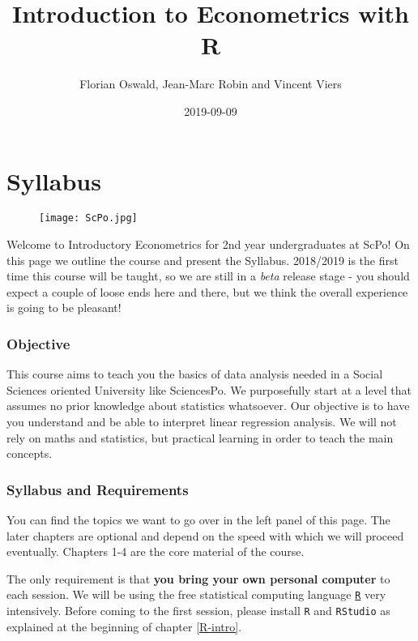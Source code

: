 \documentclass[]{book}
\title{Introduction to Econometrics with R}
\author{Florian Oswald, Jean-Marc Robin and Vincent Viers}
\date{2019-09-09}
\begin{document}
\maketitle

{
\setcounter{tocdepth}{1}
\tableofcontents
}
\chapter*{Syllabus}\label{syllabus}

\begin{figure}
\centering
\texttt{[image: ScPo.jpg]}
\caption{}
\end{figure}

Welcome to Introductory Econometrics for 2nd year undergraduates at
ScPo! On this page we outline the course and present the Syllabus.
2018/2019 is the first time this course will be taught, so we are still
in a \emph{beta} release stage - you should expect a couple of loose
ends here and there, but we think the overall experience is going to be
pleasant!

\subsection*{Objective}\label{objective}

This course aims to teach you the basics of data analysis needed in a
Social Sciences oriented University like SciencesPo. We purposefully
start at a level that assumes no prior knowledge about statistics
whatsoever. Our objective is to have you understand and be able to
interpret linear regression analysis. We will not rely on maths and
statistics, but practical learning in order to teach the main concepts.

\subsection*{Syllabus and Requirements}\label{syllabus-and-requirements}

You can find the topics we want to go over in the left panel of this
page. The later chapters are optional and depend on the speed with which
we will proceed eventually. Chapters 1-4 are the core material of the
course.

The only requirement is that \textbf{you bring your own personal
computer} to each session. We will be using the free statistical
computing language \href{https://www.r-project.org}{\texttt{R}} very
intensively. Before coming to the first session, please install
\texttt{R} and \texttt{RStudio} as explained at the beginning of chapter
\ref{R-intro}.
\end{document}
